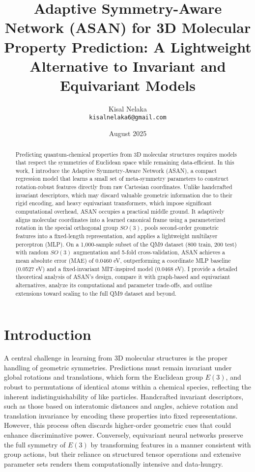 \documentclass[12pt]{article}
\title{Adaptive Symmetry-Aware Network (ASAN) for 3D Molecular Property Prediction: \newline A Lightweight Alternative to Invariant and Equivariant Models}
\author{Kisal Nelaka \\ \texttt{kisalnelaka6@gmail.com}}
\date{August 2025}
\begin{document}
\maketitle

\begin{abstract}
Predicting quantum-chemical properties from 3D molecular structures requires models that respect the symmetries of Euclidean space while remaining data-efficient. In this work, I introduce the Adaptive Symmetry-Aware Network (ASAN), a compact regression model that learns a small set of meta-symmetry parameters to construct rotation-robust features directly from raw Cartesian coordinates. Unlike handcrafted invariant descriptors, which may discard valuable geometric information due to their rigid encoding, and heavy equivariant transformers, which impose significant computational overhead, ASAN occupies a practical middle ground. It adaptively aligns molecular coordinates into a learned canonical frame using a parameterized rotation in the special orthogonal group $SO(3)$, pools second-order geometric features into a fixed-length representation, and applies a lightweight multilayer perceptron (MLP). On a 1,000-sample subset of the QM9 dataset (800 train, 200 test) with random $SO(3)$ augmentation and 5-fold cross-validation, ASAN achieves a mean absolute error (MAE) of 0.0460 eV, outperforming a coordinate MLP baseline (0.0527 eV) and a fixed-invariant MIT-inspired model (0.0468 eV). I provide a detailed theoretical analysis of ASAN’s design, compare it with graph-based and equivariant alternatives, analyze its computational and parameter trade-offs, and outline extensions toward scaling to the full QM9 dataset and beyond.
\end{abstract}

\section{Introduction}
A central challenge in learning from 3D molecular structures is the proper handling of geometric symmetries. Predictions must remain invariant under global rotations and translations, which form the Euclidean group $E(3)$, and robust to permutations of identical atoms within a chemical species, reflecting the inherent indistinguishability of like particles. Handcrafted invariant descriptors, such as those based on interatomic distances and angles, achieve rotation and translation invariance by encoding these properties into fixed representations. However, this process often discards higher-order geometric cues that could enhance discriminative power. Conversely, equivariant neural networks preserve the full symmetry of $E(3)$ by transforming features in a manner consistent with group actions, but their reliance on structured tensor operations and extensive parameter sets renders them computationally intensive and data-hungry.
\end{document}
